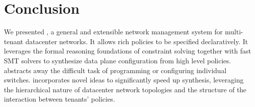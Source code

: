 \section{Conclusion}

We presented \Name, a general and extensible network management system
for multi-tenant datacenter networks. It allows rich policies to be
specified declaratively. It leverages the formal reasoning foundations
of constraint solving together with fast SMT solvers to synthesize
data plane configuration from high level policies. \name abstracts away
the difficult task of programming or configuring individual
switches. \Name incorporates novel ideas to significantly speed up
synthesis, leveraging the hierarchical nature of datacenter network
topologies and the structure of the interaction between tenants'
policies.


